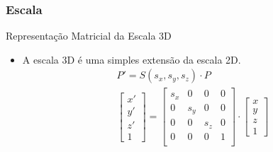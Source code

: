 \documentclass{beamer}
\begin{document}
\begin{frame}
\frametitle{Escala}

	\begin{block}{Representação Matricial da Escala 3D}
		\begin{itemize}
			\item A escala 3D é uma simples extensão da escala 2D.
			\begin{eqnarray*}
				P' = S(s_x,s_y,s_z) \cdot P\\
				\begin{bmatrix}
					x'	\\
					y'	\\
					z'	\\
					1
				\end{bmatrix}								
				= \begin{bmatrix}
					s_x	&	0	&	0	&	0	\\
					0	&	s_y	&	0	&	0	\\
					0	&	0	& 	s_z	&	0	\\
					0	&	0	&	0	&	1	\\
				\end{bmatrix}
				\cdot \begin{bmatrix}
					x	\\
					y	\\
					z	\\
					1
				\end{bmatrix}
			\end{eqnarray*}
		\end{itemize}
	\end{block}
\end{frame}
\end{document}
